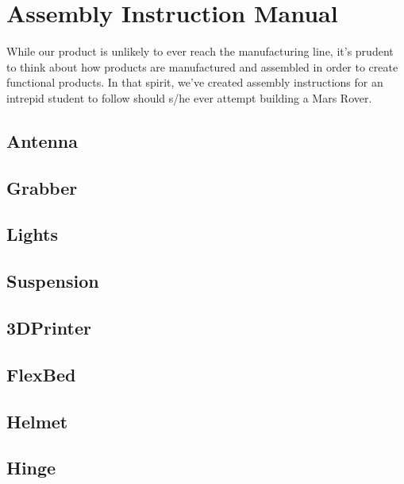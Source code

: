 \section{Assembly Instruction Manual}
While our product is unlikely to ever reach the manufacturing line, it's prudent to think about how products are manufactured and assembled in order to create functional products.
In that spirit, we've created assembly instructions for an intrepid student to follow should s/he ever attempt building a Mars Rover.

\newcommand{\AssemblyInstructionManual}[1]{
 \subsection{#1}
 
 }

\AssemblyInstructionManual{Antenna}
\AssemblyInstructionManual{Grabber}
\AssemblyInstructionManual{Lights}
\AssemblyInstructionManual{Suspension}
\AssemblyInstructionManual{3DPrinter}
\AssemblyInstructionManual{FlexBed}
\AssemblyInstructionManual{Helmet}
\AssemblyInstructionManual{Hinge}

